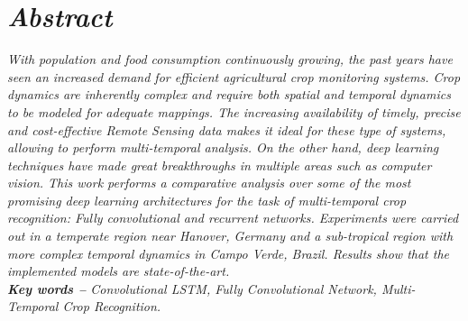 
 
\section*{\textit {Abstract}} %


\hspace{-1.5mm}\textit{ %
With population and food consumption continuously growing, the past years have seen an increased demand for efficient agricultural crop monitoring systems. Crop dynamics are inherently complex and require both spatial and temporal dynamics to be modeled for adequate mappings. The increasing availability of timely, precise and cost-effective Remote Sensing data makes it ideal for these type of systems, allowing to perform multi-temporal analysis. On the other hand, deep learning techniques have made great breakthroughs in multiple areas such as computer vision. This work performs a comparative analysis over some of the most promising deep learning architectures for the task of multi-temporal crop recognition: Fully convolutional and recurrent networks. Experiments were carried out in a temperate region near Hanover, Germany and a sub-tropical region with more complex temporal dynamics in Campo Verde, Brazil. Results show that the implemented models are state-of-the-art.
}
\\
\textit{\textbf{Key words --} %
Convolutional LSTM, Fully Convolutional Network, Multi-Temporal Crop Recognition. %
}